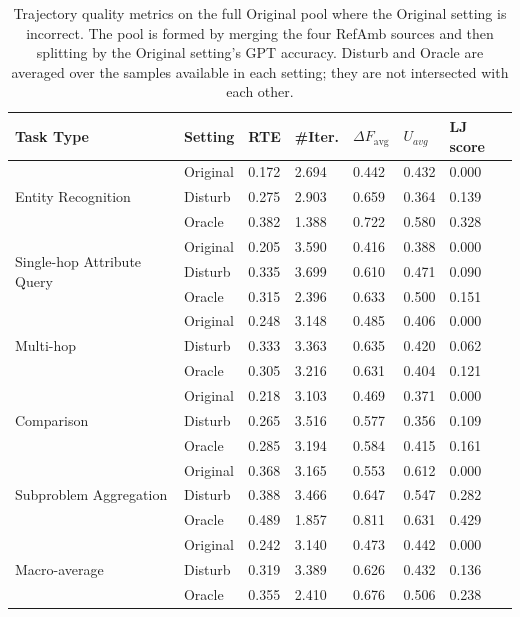 \begin{table}[htbp]
\centering
\small
\caption{Trajectory quality metrics on the full Original pool where the Original setting is incorrect. The pool is formed by merging the four RefAmb sources and then splitting by the Original setting's GPT accuracy. Disturb and Oracle are averaged over the samples available in each setting; they are not intersected with each other.}
\begin{tabular}{lllllll}
\hline
\textbf{Task Type} & \textbf{Setting} & \textbf{RTE} & \textbf{\#Iter.} & \textbf{$\Delta F_{\text{avg}}$} & \textbf{$U_{avg}$} & \textbf{LJ score} \\
\hline
\multirow{3}{*}{Entity Recognition} & Original & 0.172 & 2.694 & 0.442 & 0.432 & 0.000 \\
 & Disturb & 0.275 & 2.903 & 0.659 & 0.364 & 0.139 \\
 & Oracle & 0.382 & 1.388 & 0.722 & 0.580 & 0.328 \\
\hline
\multirow{3}{*}{Single-hop Attribute Query} & Original & 0.205 & 3.590 & 0.416 & 0.388 & 0.000 \\
 & Disturb & 0.335 & 3.699 & 0.610 & 0.471 & 0.090 \\
 & Oracle & 0.315 & 2.396 & 0.633 & 0.500 & 0.151 \\
\hline
\multirow{3}{*}{Multi-hop} & Original & 0.248 & 3.148 & 0.485 & 0.406 & 0.000 \\
 & Disturb & 0.333 & 3.363 & 0.635 & 0.420 & 0.062 \\
 & Oracle & 0.305 & 3.216 & 0.631 & 0.404 & 0.121 \\
\hline
\multirow{3}{*}{Comparison} & Original & 0.218 & 3.103 & 0.469 & 0.371 & 0.000 \\
 & Disturb & 0.265 & 3.516 & 0.577 & 0.356 & 0.109 \\
 & Oracle & 0.285 & 3.194 & 0.584 & 0.415 & 0.161 \\
\hline
\multirow{3}{*}{Subproblem Aggregation} & Original & 0.368 & 3.165 & 0.553 & 0.612 & 0.000 \\
 & Disturb & 0.388 & 3.466 & 0.647 & 0.547 & 0.282 \\
 & Oracle & 0.489 & 1.857 & 0.811 & 0.631 & 0.429 \\
\hline
\multirow{3}{*}{Macro-average} & Original & 0.242 & 3.140 & 0.473 & 0.442 & 0.000 \\
 & Disturb & 0.319 & 3.389 & 0.626 & 0.432 & 0.136 \\
 & Oracle & 0.355 & 2.410 & 0.676 & 0.506 & 0.238 \\
\hline
\end{tabular}
\end{table}
